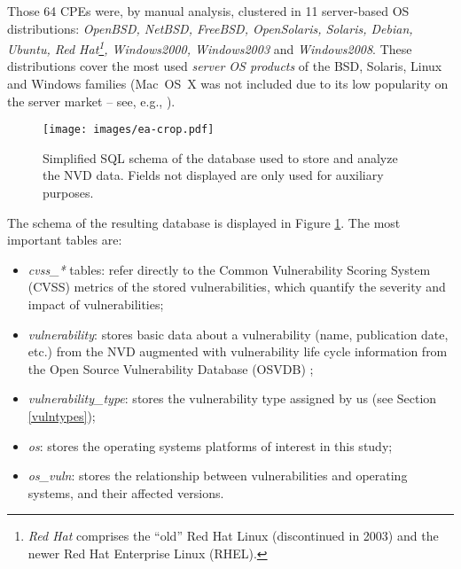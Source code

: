 Those 64 CPEs were, by manual analysis, clustered in 11 server-based OS distributions: \textit{OpenBSD, NetBSD, FreeBSD, OpenSolaris, Solaris, Debian, Ubuntu, Red Hat\footnote{\textit{Red Hat} comprises the ``old'' Red Hat Linux (discontinued in 2003) and the newer Red Hat Enterprise Linux (RHEL).}, Windows2000, Windows2003} and \textit{Windows2008}.
These distributions cover the most used \emph{server OS products} of the BSD, Solaris, Linux and Windows families (Mac~OS~X was not included due to its low popularity on the server market -- see, e.g., \cite{w3techs}).


\begin{figure}[!ht]
 \centering
 \texttt{[image: images/ea-crop.pdf]}
 \caption{Simplified SQL schema of the database used to store and analyze the NVD data. Fields not displayed are only used for auxiliary purposes.}
 \label{ea}
\end{figure}

The schema of the resulting database is displayed in Figure \ref{ea}.
The most important tables are:

\begin{itemize}
\item \emph{cvss\_*} tables: refer directly to the Common Vulnerability Scoring System (CVSS) metrics \cite{cvss} of the stored vulnerabilities, which quantify the severity and impact of vulnerabilities;
\item \emph{vulnerability}: stores basic data about a vulnerability (name, publication date, etc.) from the NVD augmented with vulnerability life cycle information from the Open Source Vulnerability Database (OSVDB) \cite{osvdb};
\item \emph{vulnerability\_type}: stores the vulnerability type assigned by us (see Section \ref{vulntypes});
\item \emph{os}: stores the operating systems platforms of interest in this study;
\item \emph{os\_vuln}: stores the relationship between vulnerabilities and operating systems, and their affected versions.
\end{itemize}

